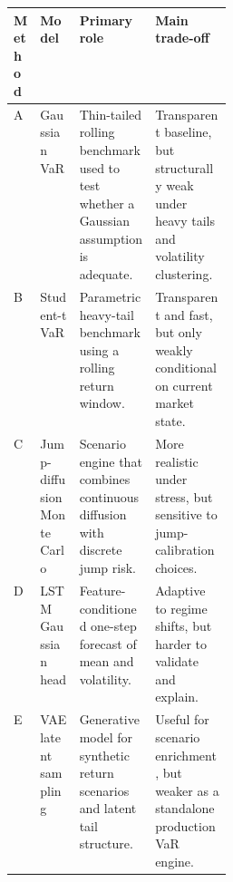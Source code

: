 \documentclass[11pt]{article}
\begin{document}
\begingroup
\small
\setlength{\tabcolsep}{4pt}
\begin{center}
\begin{tabularx}{0.98\linewidth}{@{}>{\RaggedRight\arraybackslash}p{0.10\linewidth}>{\RaggedRight\arraybackslash}p{0.18\linewidth}>{\RaggedRight\arraybackslash}X>{\RaggedRight\arraybackslash}X@{}}
\toprule
Method & Model & Primary role & Main trade-off \\
\midrule
A & Gaussian VaR & Thin-tailed rolling benchmark used to test whether a Gaussian assumption is adequate. & Transparent baseline, but structurally weak under heavy tails and volatility clustering. \\
B & Student-t VaR & Parametric heavy-tail benchmark using a rolling return window. & Transparent and fast, but only weakly conditional on current market state. \\
C & Jump-diffusion Monte Carlo & Scenario engine that combines continuous diffusion with discrete jump risk. & More realistic under stress, but sensitive to jump-calibration choices. \\
D & LSTM Gaussian head & Feature-conditioned one-step forecast of mean and volatility. & Adaptive to regime shifts, but harder to validate and explain. \\
E & VAE latent sampling & Generative model for synthetic return scenarios and latent tail structure. & Useful for scenario enrichment, but weaker as a standalone production VaR engine. \\
\bottomrule
\end{tabularx}
\end{center}
\endgroup
\end{document}
